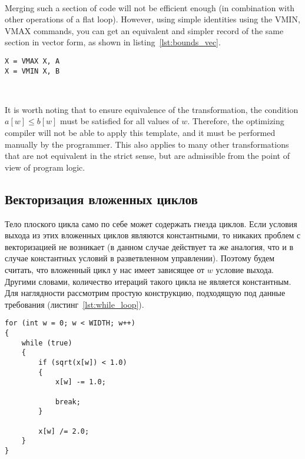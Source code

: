 \documentclass[
11pt,%
tightenlines,%
twoside,%
onecolumn,%
nofloats,%
nobibnotes,%
nofootinbib,%
superscriptaddress,%
noshowpacs,%
centertags]%
{revtex4}
\begin{document}
\

Merging such a section of code will not be efficient enough (in  combination with other operations of a flat loop).
However, using simple identities using the VMIN, VMAX commands, you can get an equivalent and simpler record of the same section in vector form, as shown in listing~\ref{lst:bounds_vec}.

\begin{lstlisting}[caption={Векторизованная форма ограничения значения величины с помощью нижней и верхней границ.},label={lst:bounds_vec}]
X = VMAX X, A
X = VMIN X, B
\end{lstlisting}

\

It is worth noting that to ensure equivalence of the transformation, the condition $a[w] \le b[w]$ must be satisfied for all values of $w$.
Therefore, the optimizing compiler will not be able to apply this template, and it must be performed manually by the programmer.
This also applies to many other transformations that are not equivalent in the strict sense, but are admissible from the point of view of program logic.

\subsection{Векторизация вложенных циклов}

Тело плоского цикла само по себе может содержать гнезда циклов.
Если условия выхода из этих вложенных циклов являются константными, то никаких проблем с векторизацией не возникает (в данном случае действует та же аналогия, что и в случае константных условий в разветвленном управлении).
Поэтому будем считать, что вложенный цикл у нас имеет зависящее от $w$ условие выхода.
Другими словами, количество итераций такого цикла не является константным.
Для наглядности рассмотрим простую конструкцию, подходящую под данные требования (листинг~\ref{lst:while_loop}).

\begin{lstlisting}[caption={Плоский цикл, содержащий цикл с неконстантным числом итераций},label={lst:while_loop}]
for (int w = 0; w < WIDTH; w++)
{
    while (true)
    {
        if (sqrt(x[w]) < 1.0)
        {
            x[w] -= 1.0;

            break;
        }
            
        x[w] /= 2.0;
    }
}
\end{lstlisting}

\
\end{document}
